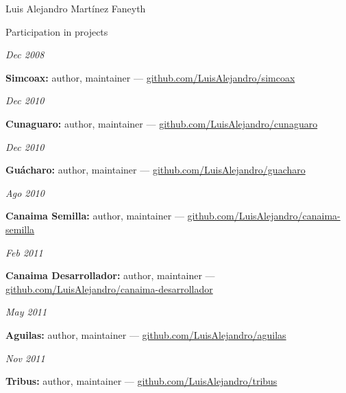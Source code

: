 \documentclass[11pt,letterpaper]{article}
\begin{document}
\begin{cv}{Luis Alejandro Mart\'inez Faneyth}
\begin{cvlist}{Participation in projects}
\item[{\parbox[t]{6em}{\textit{\large{Dec 2008}}}}]{
	\parbox[t]{\linewidth}{
		\textbf{Simcoax:} author, maintainer --- \href{http://github.com/LuisAlejandro/simcoax}{github.com/LuisAlejandro/simcoax}
	}
}
\item[{\parbox[t]{6em}{\textit{\large{Dec 2010}}}}]{
	\parbox[t]{\linewidth}{
		\textbf{Cunaguaro:} author, maintainer --- \href{http://github.com/LuisAlejandro/cunaguaro}{github.com/LuisAlejandro/cunaguaro}
	}
}
\item[{\parbox[t]{6em}{\textit{\large{Dec 2010}}}}]{
	\parbox[t]{\linewidth}{
		\textbf{Gu\'acharo:} author, maintainer --- \href{http://github.com/LuisAlejandro/guacharo}{github.com/LuisAlejandro/guacharo}
	}
}
\item[{\parbox[t]{6em}{\textit{\large{Ago 2010}}}}]{
	\parbox[t]{\linewidth}{
		\textbf{Canaima Semilla:} author, maintainer --- \href{http://github.com/LuisAlejandro/canaima-semilla}{github.com/LuisAlejandro/canaima-semilla}
	}
}
\item[{\parbox[t]{6em}{\textit{\large{Feb 2011}}}}]{
	\parbox[t]{\linewidth}{
		\textbf{Canaima Desarrollador:} author, maintainer --- \href{http://github.com/LuisAlejandro/canaima-desarrollador}{github.com/LuisAlejandro/canaima-desarrollador}
	}
}
\item[{\parbox[t]{6em}{\textit{\large{May 2011}}}}]{
	\parbox[t]{\linewidth}{
		\textbf{Aguilas:} author, maintainer --- \href{http://github.com/LuisAlejandro/aguilas}{github.com/LuisAlejandro/aguilas}
	}
}
\item[{\parbox[t]{6em}{\textit{\large{Nov 2011}}}}]{
	\parbox[t]{\linewidth}{
		\textbf{Tribus:} author, maintainer --- \href{http://github.com/LuisAlejandro/tribus}{github.com/LuisAlejandro/tribus}
	}
}
\end{cvlist}


\end{cv}
\end{document}
